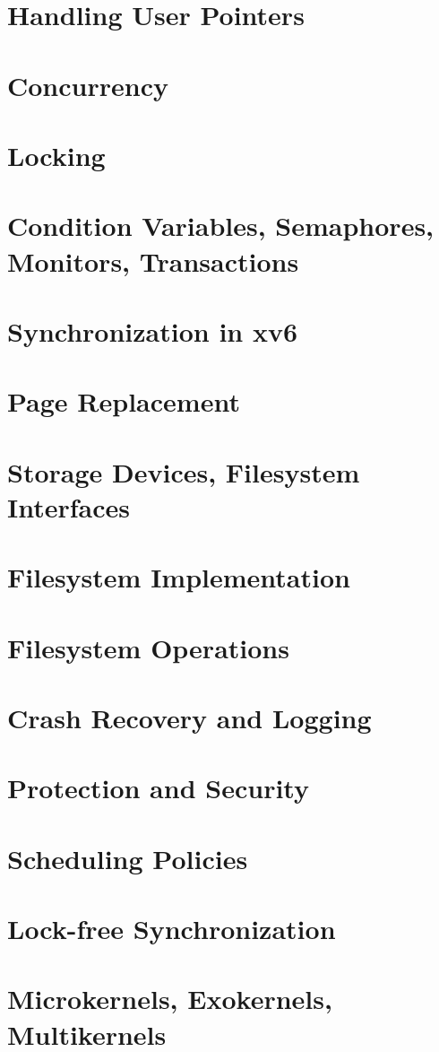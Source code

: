 \section{Handling User Pointers}
\section{Concurrency}
\section{Locking}
\section{Condition Variables, Semaphores, Monitors, Transactions}
\section{Synchronization in xv6}
\section{Page Replacement}
\section{Storage Devices, Filesystem Interfaces}
\section{Filesystem Implementation}
\section{Filesystem Operations}
\section{Crash Recovery and Logging}
\section{Protection and Security}
\section{Scheduling Policies}
\section{Lock-free Synchronization}
\section{Microkernels, Exokernels, Multikernels}


